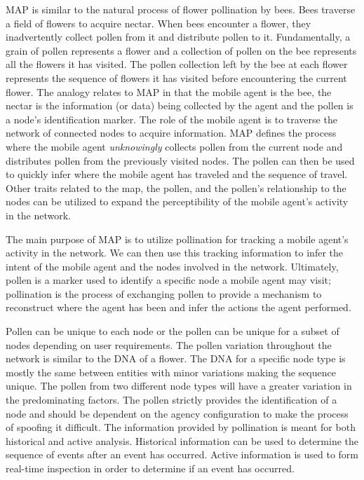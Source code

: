\documentclass{acm_proc_article-sp}
\begin{document}
MAP is similar to the natural process of flower pollination by bees.  Bees traverse a field of flowers to acquire nectar.  When bees encounter a flower, they inadvertently collect pollen from it and distribute pollen to it.  Fundamentally, a grain of pollen represents a flower and a collection of pollen on the bee represents all the flowers it has visited.  The pollen collection left by the bee at each flower represents the sequence of flowers it has visited before encountering the current flower.  The analogy relates to MAP in that the mobile agent is the bee, the nectar is the information (or data) being collected by the agent and the pollen is a node's identification marker.  The role of the mobile agent is to traverse the network of connected nodes to acquire information.  MAP defines the process where the mobile agent {\it unknowingly} collects pollen from the current node and distributes pollen from the previously visited nodes.  The pollen can then be used to quickly infer where the mobile agent has traveled and the sequence of travel.  Other traits related to the map, the pollen, and the pollen's relationship to the nodes can be utilized to expand the perceptibility of the mobile agent's activity in the network.

The main purpose of MAP is to utilize pollination for tracking a mobile agent's activity in the network.  We can then use this tracking information to infer the intent of the mobile agent and the nodes involved in the network.  Ultimately, pollen is a marker used to identify a specific node a mobile agent may visit; pollination is the process of exchanging pollen to provide a mechanism to reconstruct where the agent has been and infer the actions the agent performed.

Pollen can be unique to each node or the pollen can be unique for a subset of nodes depending on user requirements.  The pollen variation throughout the network is similar to the DNA of a flower.  The DNA for a specific node type is mostly the same between entities with minor variations making the sequence unique.  The pollen from two different node types will have a greater variation in the predominating factors.  The pollen strictly provides the identification of a node and should be dependent on the agency configuration to make the process of spoofing it difficult.  The information provided by pollination is meant for both historical and active analysis.  Historical information can be used to determine the sequence of events after an event has occurred.  Active information is used to form real-time inspection in order to determine if an event has occurred.
\end{document}
